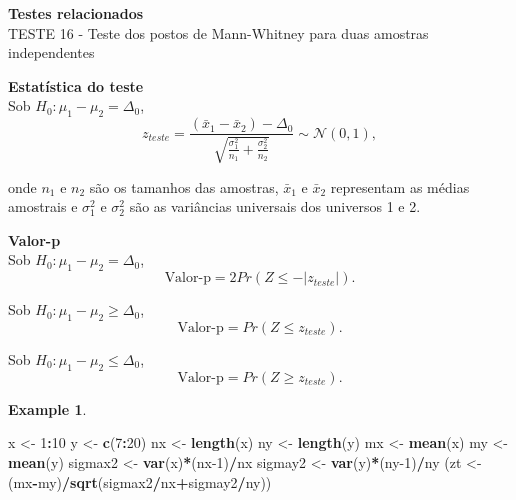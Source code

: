 \documentclass[
]{book}
\newenvironment{Shaded}{\begin{snugshade}}{\end{snugshade}}
\newcommand{\DecValTok}[1]{\textcolor[rgb]{0.00,0.00,0.81}{#1}}
\newcommand{\KeywordTok}[1]{\textcolor[rgb]{0.13,0.29,0.53}{\textbf{#1}}}
\newcommand{\NormalTok}[1]{#1}
\newcommand{\OperatorTok}[1]{\textcolor[rgb]{0.81,0.36,0.00}{\textbf{#1}}}
\newcommand{\StringTok}[1]{\textcolor[rgb]{0.31,0.60,0.02}{#1}}
\theoremstyle{definition}
\theoremstyle{definition}
\newtheorem{example}{Example}[chapter]
\theoremstyle{definition}
\theoremstyle{remark}
\begin{document}
\textbf{Testes relacionados}\\
TESTE 16 - Teste dos postos de Mann-Whitney para duas amostras independentes

\textbf{Estatística do teste}\\
Sob \(H_0: \mu_1-\mu_2 = \Delta_0\),
\begin{equation}
z_{teste} = \frac{(\bar{x}_1-\bar{x}_2) - \Delta_0}{\sqrt{\frac{\sigma_1^2}{n_1}+\frac{\sigma_2^2}{n_2}}} \sim \mathcal{N}(0,1),
\label{eq:z-teste-media-bi}
\end{equation}

onde \(n_1\) e \(n_2\) são os tamanhos das amostras, \(\bar{x}_1\) e \(\bar{x}_2\) representam as médias amostrais e \(\sigma_1^2\) e \(\sigma_2^2\) são as variâncias universais dos universos 1 e 2.

\textbf{Valor-p}\\
Sob \(H_0: \mu_1-\mu_2 = \Delta_0\),
\begin{equation}
\text{Valor-p} = 2Pr(Z \le -|z_{teste}|).
\label{eq:z-teste-media-bi-p-bi}
\end{equation}

Sob \(H_0: \mu_1-\mu_2 \ge \Delta_0\),
\begin{equation}
\text{Valor-p} = Pr(Z \le z_{teste}).
\label{eq:z-teste-media-bi-p-uni-inf}
\end{equation}

Sob \(H_0: \mu_1-\mu_2 \le \Delta_0\),
\begin{equation}
\text{Valor-p} = Pr(Z \ge z_{teste}).
\label{eq:z-teste-media-bi-p-uni-sup}
\end{equation}

\begin{example}
\protect\hypertarget{exm:z-duas-medias-indep}{}{\label{exm:z-duas-medias-indep} }
\end{example}

\begin{Shaded}
\begin{Highlighting}[]
\NormalTok{x \textless{}{-}}\StringTok{ }\DecValTok{1}\OperatorTok{:}\DecValTok{10}
\NormalTok{y \textless{}{-}}\StringTok{ }\KeywordTok{c}\NormalTok{(}\DecValTok{7}\OperatorTok{:}\DecValTok{20}\NormalTok{)}
\NormalTok{nx \textless{}{-}}\StringTok{ }\KeywordTok{length}\NormalTok{(x)}
\NormalTok{ny \textless{}{-}}\StringTok{ }\KeywordTok{length}\NormalTok{(y)}
\NormalTok{mx \textless{}{-}}\StringTok{ }\KeywordTok{mean}\NormalTok{(x)}
\NormalTok{my \textless{}{-}}\StringTok{ }\KeywordTok{mean}\NormalTok{(y)}
\NormalTok{sigmax2 \textless{}{-}}\StringTok{ }\KeywordTok{var}\NormalTok{(x)}\OperatorTok{*}\NormalTok{(nx}\DecValTok{{-}1}\NormalTok{)}\OperatorTok{/}\NormalTok{nx}
\NormalTok{sigmay2 \textless{}{-}}\StringTok{ }\KeywordTok{var}\NormalTok{(y)}\OperatorTok{*}\NormalTok{(ny}\DecValTok{{-}1}\NormalTok{)}\OperatorTok{/}\NormalTok{ny}
\NormalTok{(zt \textless{}{-}}\StringTok{ }\NormalTok{(mx}\OperatorTok{{-}}\NormalTok{my)}\OperatorTok{/}\KeywordTok{sqrt}\NormalTok{(sigmax2}\OperatorTok{/}\NormalTok{nx}\OperatorTok{+}\NormalTok{sigmay2}\OperatorTok{/}\NormalTok{ny))}
\end{Highlighting}
\end{Shaded}
\end{document}
